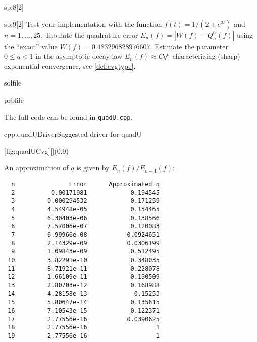 \begin{samproblem}
\begin{subproblem}{sp:8}[2]
\end{subproblem}

\begin{subproblem}{sp:9}[2]
  Test your implementation with the function $f(t)=1/(2+e^{3t})$ and $n=1,\dots,25$. 
  Tabulate the quadrature error $E_n(f)=|W(f)-Q^U_n(f)|$ using the  ``exact'' value $W(f)=0.483296828976607$. 
  Estimate the parameter $0\le q<1$ in the asymptotic decay law $E_n(f)\approx Cq^n$ characterizing (sharp) 
  exponential convergence, see \cref{def:cvgtype}. 

  \begin{samwriteprbpart}{solfile}
    \begin{writeverbatim}{prbfile}
      \begin{samsolution}
        The full code can be found in \texttt{quadU.cpp}.
        \begin{samcode}{cpp:quadUDriver}{Suggested driver for quadU}
        \end{samcode}

        \begin{minipage}[h]{0.47\textwidth}
            \centering
            [fig:quadUCvg][](0.9\textwidth)
        \end{minipage}
          \hfill
        \begin{minipage}[h]{0.53\textwidth}
          An approximation of $q$ is given by $E_n(f)/E_{n-1}(f)$:
          \small
          \begin{lstlisting}
  n               Error      Approximated q
  2          0.00171981            0.194545
  3         0.000294532            0.171259
  4         4.54948e-05            0.154465
  5         6.30403e-06            0.138566
  6         7.57006e-07            0.120083
  7         6.99966e-08           0.0924651
  8         2.14329e-09           0.0306199
  9         1.09843e-09            0.512495
 10         3.82291e-10            0.348035
 11         8.71921e-11            0.228078
 12         1.66109e-11            0.190509
 13         2.80703e-12            0.168988
 14         4.28158e-13             0.15253
 15         5.80647e-14            0.135615
 16         7.10543e-15            0.122371
 17         2.77556e-16           0.0390625
 18         2.77556e-16                   1
 19         2.77556e-16                   1
          \end{lstlisting}
        \end{minipage}
      \end{samsolution}
    \end{writeverbatim}
  \end{samwriteprbpart}

\end{subproblem}

\end{samproblem}
